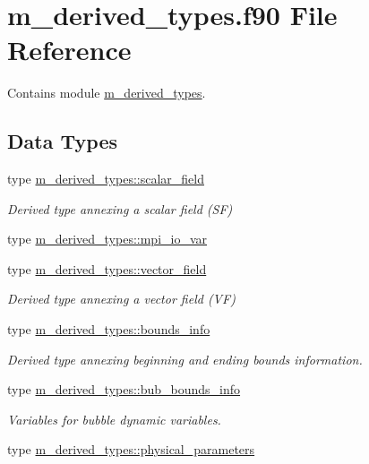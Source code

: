 \hypertarget{m__derived__types_8f90}{}\section{m\+\_\+derived\+\_\+types.\+f90 File Reference}
\label{m__derived__types_8f90}


Contains module \hyperlink{namespacem__derived__types}{m\+\_\+derived\+\_\+types}.  


\subsection*{Data Types}
\begin{DoxyCompactItemize}
\item 
type \hyperlink{structm__derived__types_1_1scalar__field}{m\+\_\+derived\+\_\+types\+::scalar\+\_\+field}
\begin{DoxyCompactList}\small\item\em Derived type annexing a scalar field (SF) \end{DoxyCompactList}\item 
type \hyperlink{structm__derived__types_1_1mpi__io__var}{m\+\_\+derived\+\_\+types\+::mpi\+\_\+io\+\_\+var}
\item 
type \hyperlink{structm__derived__types_1_1vector__field}{m\+\_\+derived\+\_\+types\+::vector\+\_\+field}
\begin{DoxyCompactList}\small\item\em Derived type annexing a vector field (VF) \end{DoxyCompactList}\item 
type \hyperlink{structm__derived__types_1_1bounds__info}{m\+\_\+derived\+\_\+types\+::bounds\+\_\+info}
\begin{DoxyCompactList}\small\item\em Derived type annexing beginning and ending bounds information. \end{DoxyCompactList}\item 
type \hyperlink{structm__derived__types_1_1bub__bounds__info}{m\+\_\+derived\+\_\+types\+::bub\+\_\+bounds\+\_\+info}
\begin{DoxyCompactList}\small\item\em Variables for bubble dynamic variables. \end{DoxyCompactList}\item 
type \hyperlink{structm__derived__types_1_1physical__parameters}{m\+\_\+derived\+\_\+types\+::physical\+\_\+parameters}

\end{DoxyCompactItemize}
